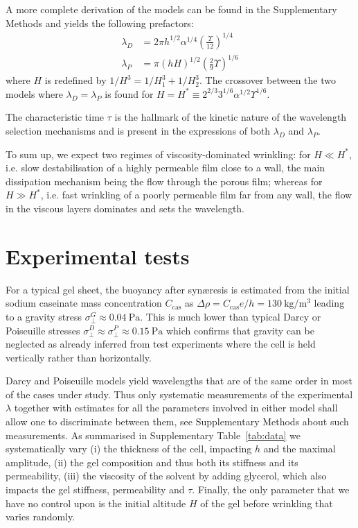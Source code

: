 \documentclass[twocolumn,superscriptaddress,showpacs,preprintnumbers,
amsmath,amssymb,prl]{revtex4-1}
\begin{document}
A more complete derivation of the models can be found in the Supplementary Methods and yields the following prefactors:
\begin{align}
\lambda_D &= 2\pi h^{1/2}\alpha^{1/4}\left(\frac{\Upsilon}{12}\right)^{1/4}\label{eq:prefDarcy}\\
\lambda_P &= \pi (hH)^{1/2}\left(\frac{2}{9}\Upsilon\right)^{1/6}\label{eq:prefPoiseuille}
\end{align}
where $H$ is redefined by $1/H^3 = 1/H_1^3 + 1/H_2^3$. The crossover between the two models where $\lambda_D=\lambda_P$ is found for $H = H^* \equiv 2^{2/3} 3^{1/6} \alpha^{1/2} \Upsilon^{1/6}$.

The characteristic time $\tau$ is the hallmark of the kinetic nature of the wavelength selection mechanisms and is present in the expressions of both $\lambda_D$ and $\lambda_P$. 

To sum up, we expect two regimes of viscosity-dominated wrinkling: for $H\ll H^*$, i.e. slow destabilisation of a highly permeable film close to a wall, the main dissipation mechanism being the flow through the porous film; whereas for $H\gg H^*$, i.e. fast wrinkling of a poorly permeable film far from any wall, the flow in the viscous layers dominates and sets the wavelength.

\section*{Experimental tests}

For a typical gel sheet, the buoyancy after syn\ae{}resis is estimated from the initial sodium caseinate mass concentration $C_\text{cas}$ as $\Delta\rho=C_\text{cas} e/h = \SI{130}{\kilo\gram\per\cubic\metre}$ leading to a gravity stress $\sigma_\perp^G \approx \SI{0.04}{\pascal}$. This is much lower than typical Darcy or Poiseuille stresses $\sigma_\perp^D \approx \sigma_\perp^P \approx \SI{0.15}{\pascal}$ which confirms that gravity can be neglected as already inferred from test experiments where the cell is held vertically rather than horizontally.


Darcy and Poiseuille models yield wavelengths that are of the same order in most of the cases under study. Thus only systematic measurements of the experimental $\lambda$ together with estimates for all the parameters involved in either model shall allow one to discriminate between them, see Supplementary Methods about such measurements. As summarised in Supplementary Table~\ref{tab:data} we systematically vary (i) the thickness of the cell, impacting $h$ and the maximal amplitude, (ii) the gel composition and thus both its stiffness and its permeability, (iii) the viscosity of the solvent by adding glycerol, which also impacts the gel stiffness, permeability and $\tau$. Finally, the only parameter that we have no control upon is the initial altitude $H$ of the gel before wrinkling that varies randomly. 
\end{document}
